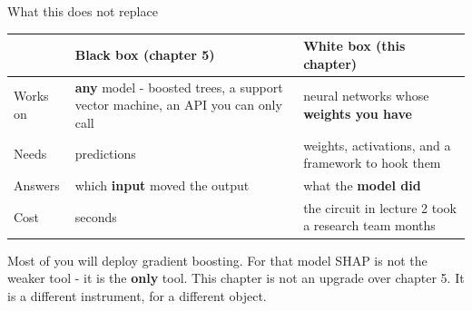 \documentclass[aspectratio=169]{beamer}
\newcommand{\watchbox}[1]{%
  \begin{tcolorbox}[colback=armorange!12, colframe=armorange, boxrule=0.6pt, arc=2pt]
  #1
  \end{tcolorbox}}
\begin{document}
\begin{frame}{What this does not replace}
  \vspace{0.4em}
  \begin{center}
  \small
  \begin{tabular}{@{}p{}p{}p{}@{}}
    \toprule
    & \textbf{Black box} (chapter 5) & \textbf{White box} (this chapter)\\
    \midrule
    Works on & \textbf{any} model - boosted trees, a support vector machine, an API you can
      only call & neural networks whose \textbf{weights you have}\\[0.5em]
    Needs & predictions & weights, activations, and a framework to hook them\\[0.5em]
    Answers & which \textbf{input} moved the output & what the \textbf{model did}\\[0.5em]
    Cost & seconds & the circuit in lecture 2 took a research team months\\
    \bottomrule
  \end{tabular}
  \end{center}

  \vspace{0.8em}
  \watchbox{Most of you will deploy gradient boosting. For that model SHAP is not the weaker
  tool - it is the \textbf{only} tool. This chapter is not an upgrade over chapter 5. It is a
  different instrument, for a different object.}
\end{frame}
\end{document}

